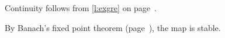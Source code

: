 Continuity follows from \cref{l:exgre} on page~\pageref{l:exgre}.

By Banach's fixed point theorem (page~\pageref{t:bfpt}), the map is stable.
